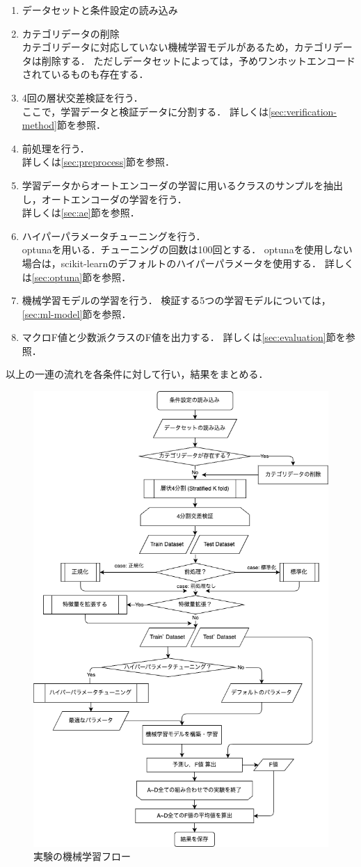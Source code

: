\begin{enumerate}
  \item データセットと条件設定の読み込み
  \item カテゴリデータの削除\\
    カテゴリデータに対応していない機械学習モデルがあるため，カテゴリデータは削除する．
    ただしデータセットによっては，予めワンホットエンコードされているものも存在する．
  \item 4回の層状交差検証を行う．\\
    ここで，学習データと検証データに分割する．
    詳しくは\ref{sec:verification-method}節を参照．
  \item 前処理を行う．\\
    詳しくは\ref{sec:preprocess}節を参照．
  \item 学習データからオートエンコーダの学習に用いるクラスのサンプルを抽出し，オートエンコーダの学習を行う．\\
    詳しくは\ref{sec:ae}節を参照．
  \item ハイパーパラメータチューニングを行う．\\
    optunaを用いる．チューニングの回数は100回とする．
    optunaを使用しない場合は，scikit-learnのデフォルトのハイパーパラメータを使用する．
    詳しくは\ref{sec:optuna}節を参照．
  \item 機械学習モデルの学習を行う．
    検証する5つの学習モデルについては，\ref{sec:ml-model}節を参照．
  \item マクロF値と少数派クラスのF値を出力する．
    詳しくは\ref{sec:evaluation}節を参照．
\end{enumerate}

以上の一連の流れを各条件に対して行い，結果をまとめる．

\begin{figure}[htbp]  
  \centering
  \includegraphics[width=0.6\linewidth\centering]{figures/ml-flow.png}
  \caption{実験の機械学習フロー}
  \label{fig:ml-flow}
\end{figure}
